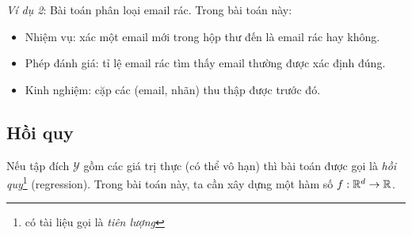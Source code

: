 \textit{Ví dụ 2}: Bài toán phân loại email rác. Trong bài toán này:
\begin{itemize}
\item Nhiệm vụ: xác một email mới trong hộp thư đến là email rác hay không.

\item Phép đánh giá: tỉ lệ email rác tìm thấy email thường được xác định đúng.

\item Kinh nghiệm: cặp các (email, nhãn) thu thập được trước đó.
\end{itemize}





\subsection{Hồi quy}
Nếu tập đích $\mathcal{Y}$ gồm các giá trị thực (có thể vô hạn)
thì bài toán được gọi là \textit{hồi quy}\footnote{có tài liệu gọi là
\textit{tiên lượng}} (regression). Trong bài toán này, ta cần xây dựng một hàm số $f: \mathbb{R}^d
\rightarrow \mathbb{R}$.

